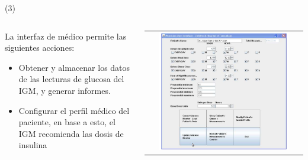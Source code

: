 \begin{frame}{ (3)}
\begin{columns}
		\begin{column}{0.48\textwidth}
		La interfaz de médico permite las siguientes acciones:
		\begin{itemize}
		\item Obtener y almacenar los datos de las lecturas de glucosa del IGM, y generar informes.
		\item Configurar el perfil médico del paciente, en base a esto, el IGM recomienda las dosis de insulina		
        \end{itemize}
				\end{column}
				\begin{column}{0.48\textwidth}
\begin{center}
     \begin{tabular}{c}
         \includegraphics[width=0.86\textwidth]{Figs/IntelligentGlucometer4}
          \end{tabular}
\end{center}
		\end{column}
				\end{columns}
\end{frame}


